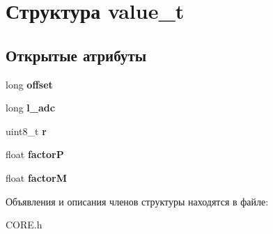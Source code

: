 \hypertarget{structvalue__t}{\section{Структура value\-\_\-t}
\label{structvalue__t}
}
\subsection*{Открытые атрибуты}
\begin{DoxyCompactItemize}
\item 
\hypertarget{structvalue__t_a25f0f66622ec0d30b02bd32fb0ae0358}{long {\bfseries offset}}\label{structvalue__t_a25f0f66622ec0d30b02bd32fb0ae0358}

\item 
\hypertarget{structvalue__t_a4e97ccc0a424f30a9c42847fec0ec03a}{long {\bfseries l\-\_\-adc}}\label{structvalue__t_a4e97ccc0a424f30a9c42847fec0ec03a}

\item 
\hypertarget{structvalue__t_a24677bd8cfa58c17f7b5272086a2881a}{uint8\-\_\-t {\bfseries r}}\label{structvalue__t_a24677bd8cfa58c17f7b5272086a2881a}

\item 
\hypertarget{structvalue__t_a3c840092a574a548b5c0889ac439ecd1}{float {\bfseries factor\-P}}\label{structvalue__t_a3c840092a574a548b5c0889ac439ecd1}

\item 
\hypertarget{structvalue__t_adb5ec8ac2918358cdd2b2c39869fd5ff}{float {\bfseries factor\-M}}\label{structvalue__t_adb5ec8ac2918358cdd2b2c39869fd5ff}

\end{DoxyCompactItemize}


Объявления и описания членов структуры находятся в файле\-:\begin{DoxyCompactItemize}
\item 
C\-O\-R\-E.\-h\end{DoxyCompactItemize}
